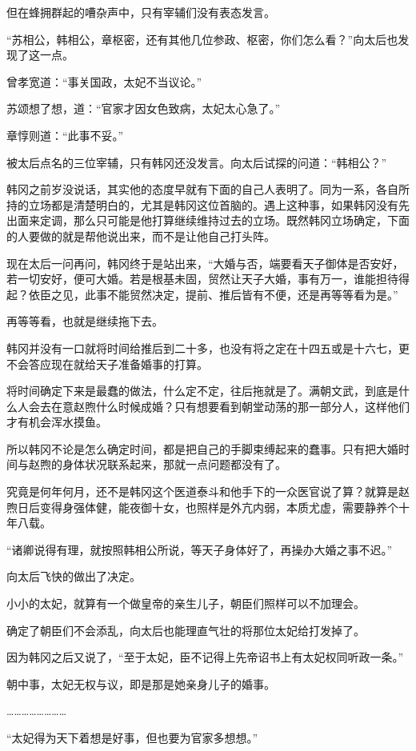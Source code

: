 但在蜂拥群起的嘈杂声中，只有宰辅们没有表态发言。

“苏相公，韩相公，章枢密，还有其他几位参政、枢密，你们怎么看？”向太后也发现了这一点。

曾孝宽道：“事关国政，太妃不当议论。”

苏颂想了想，道：“官家才因女色致病，太妃太心急了。”

章惇则道：“此事不妥。”

被太后点名的三位宰辅，只有韩冈还没发言。向太后试探的问道：“韩相公？”

韩冈之前岁没说话，其实他的态度早就有下面的自己人表明了。同为一系，各自所持的立场都是清楚明白的，尤其是韩冈这位首脑的。遇上这种事，如果韩冈没有先出面来定调，那么只可能是他打算继续维持过去的立场。既然韩冈立场确定，下面的人要做的就是帮他说出来，而不是让他自己打头阵。

现在太后一问再问，韩冈终于是站出来，“大婚与否，端要看天子御体是否安好，若一切安好，便可大婚。若是根基未固，贸然让天子大婚，事有万一，谁能担待得起？依臣之见，此事不能贸然决定，提前、推后皆有不便，还是再等等看为是。”

再等等看，也就是继续拖下去。

韩冈并没有一口就将时间给推后到二十多，也没有将之定在十四五或是十六七，更不会答应现在就给天子准备婚事的打算。

将时间确定下来是最蠢的做法，什么定不定，往后拖就是了。满朝文武，到底是什么人会去在意赵煦什么时候成婚？只有想要看到朝堂动荡的那一部分人，这样他们才有机会浑水摸鱼。

所以韩冈不论是怎么确定时间，都是把自己的手脚束缚起来的蠢事。只有把大婚时间与赵煦的身体状况联系起来，那就一点问题都没有了。

究竟是何年何月，还不是韩冈这个医道泰斗和他手下的一众医官说了算？就算是赵煦日后变得身强体健，能夜御十女，也照样是外亢内弱，本质尤虚，需要静养个十年八载。

“诸卿说得有理，就按照韩相公所说，等天子身体好了，再操办大婚之事不迟。”

向太后飞快的做出了决定。

小小的太妃，就算有一个做皇帝的亲生儿子，朝臣们照样可以不加理会。

确定了朝臣们不会添乱，向太后也能理直气壮的将那位太妃给打发掉了。

因为韩冈之后又说了，“至于太妃，臣不记得上先帝诏书上有太妃权同听政一条。”

朝中事，太妃无权与议，即是那是她亲身儿子的婚事。

……………………

“太妃得为天下着想是好事，但也要为官家多想想。”

